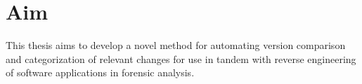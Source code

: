 \section{Aim}
\label{sec:aim}

This thesis aims to develop a novel method for automating version comparison and categorization of relevant changes for use in tandem with reverse engineering of software applications in forensic analysis.

